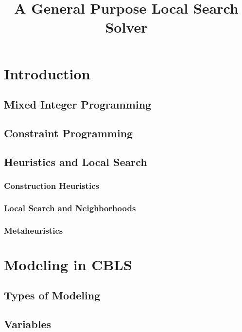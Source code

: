 \documentclass[a4paper,12pt]{article}
\title{A General Purpose Local Search Solver}
\begin{document}
\maketitle

\tableofcontents
\newpage
\section{Introduction}
  \subsection{Mixed Integer Programming}
  \subsection{Constraint Programming}
  \subsection{Heuristics and Local Search}
  \subsubsection{Construction Heuristics}
  \subsubsection{Local Search and Neighborhoods}
  \subsubsection{Metaheuristics}

\section{Modeling in CBLS}
  \subsection{Types of Modeling }
  \subsection{Variables} 
  
\end{document}
